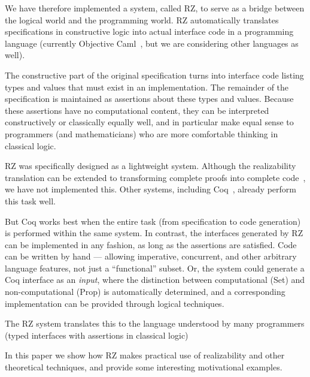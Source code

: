 \bigskip

We have therefore implemented a system, called RZ, to serve as a bridge between
the logical world and the programming world. RZ automatically translates
specifications in constructive logic into actual interface code in a
programming language (currently Objective Caml~\cite{ocaml}, but we are
considering other languages as well).

The constructive part of the original specification turns into interface code
listing types and values that must exist in an implementation. The remainder of
the specification is maintained as assertions about these types and values.
Because these assertions have no computational content, they can be interpreted
constructively or classically equally well, and in particular make equal sense
to programmers (and mathematicians) who are more comfortable thinking in
classical logic.

\bigskip

RZ was specifically designed as a lightweight system. Although the
realizability translation can be extended to transforming complete
proofs into complete code~\cite{komagata+:tr95}, we have not
implemented this. Other systems, including Coq~\cite{coqart}, already
perform this task well.

But Coq works best when the entire task (from specification to code
generation) is performed within the same system. In contrast, the
interfaces generated by RZ can be implemented in any fashion, as long
as the assertions are satisfied. Code can be written by hand ---
allowing imperative, concurrent, and other arbitrary language
features, not just a ``functional'' subset. Or, the system could
generate a Coq interface as an \emph{input}, where the distinction
between computational (Set) and non-computational (Prop) is
automatically determined, and a corresponding implementation can be
provided through logical techniques.



The RZ system translates this to the language understood by many
programmers (typed interfaces with assertions in classical logic)

\bigskip

In this paper we show how RZ makes practical use of realizability and
other theoretical techniques, and provide some interesting motivational
examples.


